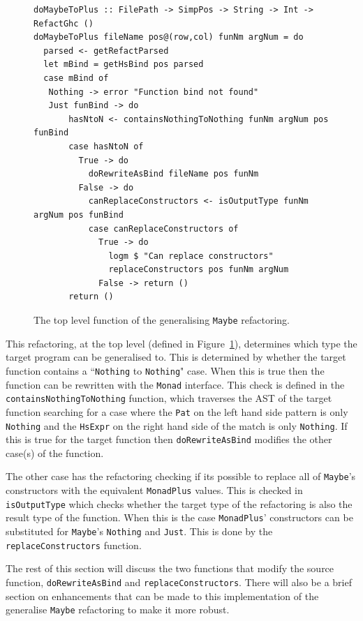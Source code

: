 \begin{figure}[t]
\begin{lstlisting}
doMaybeToPlus :: FilePath -> SimpPos -> String -> Int -> RefactGhc ()  
doMaybeToPlus fileName pos@(row,col) funNm argNum = do
  parsed <- getRefactParsed
  let mBind = getHsBind pos parsed
  case mBind of
   Nothing -> error "Function bind not found"
   Just funBind -> do
       hasNtoN <- containsNothingToNothing funNm argNum pos funBind
       case hasNtoN of
         True -> do
           doRewriteAsBind fileName pos funNm
         False -> do 
           canReplaceConstructors <- isOutputType funNm argNum pos funBind
           case canReplaceConstructors of
             True -> do
               logm $ "Can replace constructors"
               replaceConstructors pos funNm argNum
             False -> return ()
       return ()
\end{lstlisting} 
\caption{The top level function of the generalising \texttt{Maybe} refactoring.}
\label{genMaybeTopLevel}
\end{figure}

This refactoring, at the top level (defined in Figure~\ref{genMaybeTopLevel}), determines which type the target program can be generalised to. This is determined by whether the target function contains a ``\texttt{Nothing} to \texttt{Nothing}" case. When this is true then the function can be rewritten with the \texttt{Monad} interface. This check is defined in the \texttt{containsNothingToNothing} function, which traverses the AST of the target function searching for a case where the \texttt{Pat} on the left hand side pattern is only \texttt{Nothing} and the \texttt{HsExpr} on the right hand side of the match is only \texttt{Nothing}. If this is true for the target function then \texttt{doRewriteAsBind} modifies the other case(s) of the function.

The other case has the refactoring checking if its possible to replace all of \texttt{Maybe}'s constructors with the equivalent \texttt{MonadPlus} values. This is checked in \texttt{isOutputType} which checks whether the target type of the refactoring is also the result type of the function. When this is the case \texttt{MonadPlus}' constructors can be substituted for \texttt{Maybe}'s \texttt{Nothing} and \texttt{Just}. This is done by the \texttt{replaceConstructors} function.

The rest of this section will discuss the two functions that modify the source function, \texttt{doRewriteAsBind} and \texttt{replaceConstructors}. There will also be a brief section on enhancements that can be made to this implementation of the generalise \texttt{Maybe} refactoring to make it more robust.

